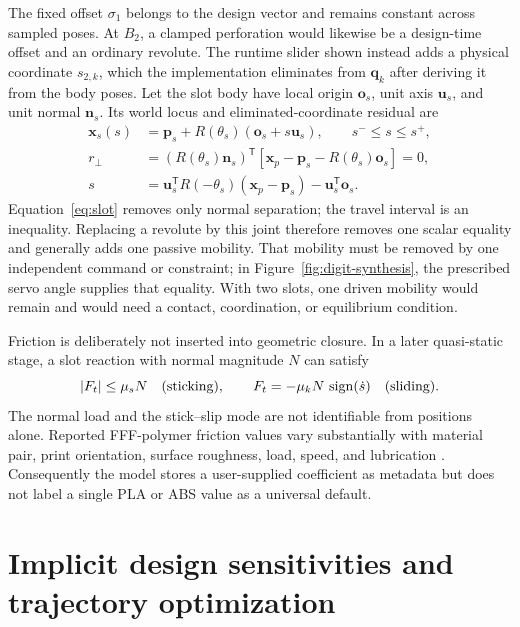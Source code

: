 \documentclass[11pt]{article}
\begin{document}
The fixed offset $\sigma_1$ belongs to the design vector and remains constant
across sampled poses. At $B_2$, a clamped perforation would likewise be a
design-time offset and an ordinary revolute. The runtime slider shown instead
adds a physical coordinate $s_{2,k}$, which the implementation eliminates from
$\mathbf q_k$ after deriving it from the body poses. Let the slot body have
local origin $\mathbf o_s$, unit axis $\mathbf u_s$, and unit normal
$\mathbf n_s$. Its world locus and eliminated-coordinate residual are
\begin{align}
  \mathbf{x}_s(s)&=\mathbf p_s+R(\theta_s)
    (\mathbf o_s+s\mathbf u_s),\qquad s^-\le s\le s^+,\\
  r_{\perp}&=(R(\theta_s)\mathbf n_s)^{\mathsf T}
    \left[\mathbf{x}_p-\mathbf p_s-R(\theta_s)\mathbf o_s\right]=0,\label{eq:slot}\\
  s&=\mathbf u_s^{\mathsf T}R(-\theta_s)
    (\mathbf{x}_p-\mathbf p_s)-\mathbf u_s^{\mathsf T}\mathbf o_s.
\end{align}
Equation~\eqref{eq:slot} removes only normal separation; the travel interval is
an inequality. Replacing a revolute by this joint therefore removes one scalar
equality and generally adds one passive mobility. That mobility must be removed
by one independent command or constraint; in Figure~\ref{fig:digit-synthesis},
the prescribed servo angle supplies that equality. With two slots, one driven
mobility would remain and would need a contact, coordination, or equilibrium
condition.

Friction is deliberately not inserted into geometric closure. In a later
quasi-static stage, a slot reaction with normal magnitude $N$ can satisfy
\begin{equation}
  |F_t|\le \mu_s N \quad\hbox{(sticking)},\qquad
  F_t=-\mu_kN\,\operatorname{sign}(\dot s) \quad\hbox{(sliding)}.
\end{equation}
The normal load and the stick--slip mode are not identifiable from positions
alone. Reported FFF-polymer friction values vary substantially with material
pair, print orientation, surface roughness, load, speed, and lubrication
\cite{przekop2020graphite,he2023tribological,norani2020abs}. Consequently the
model stores a user-supplied coefficient as metadata but does not label a
single PLA or ABS value as a universal default.

\section{Implicit design sensitivities and trajectory optimization}
\end{document}
